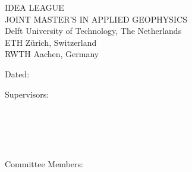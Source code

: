 \thispagestyle{empty}
\vspace*{8em}
\begin{center}
  {\large IDEA LEAGUE}\\
  {\large JOINT MASTER'S IN APPLIED GEOPHYSICS}\\[3em]
  Delft University of Technology, The Netherlands\\
  ETH Zürich, Switzerland\\
  RWTH Aachen, Germany
\end{center}

\vspace{2cm}
\mbox{}\hfill Dated: \textit{\mydate}
\vspace{2cm}

\noindent
Supervisors: \hfill \underline{\hspace{7cm}}\\
\mbox{}        \hfill \myreaderone\\[2em]
%
\mbox{}        \hfill \underline{\hspace{7cm}}\\
\mbox{}        \hfill \myreadertwo\\[2em]

\mbox{}        \hfill \underline{\hspace{7cm}}\\
\mbox{}        \hfill \myreaderthree\\[2em]
%
Committee Members: \hfill \underline{\hspace{7cm}}\\
\mbox{}            \hfill \myreaderone\\[1em]
%
\mbox{}            \hfill \underline{\hspace{7cm}}\\
\mbox{}            \hfill \myreadertwo\\[1em]
%
\mbox{}            \hfill \underline{\hspace{7cm}}\\
\mbox{}            \hfill \myreaderthree

\mbox{}            \hfill \underline{\hspace{7cm}}\\
\mbox{}            \hfill \myreaderfour

\cleardoublepage
